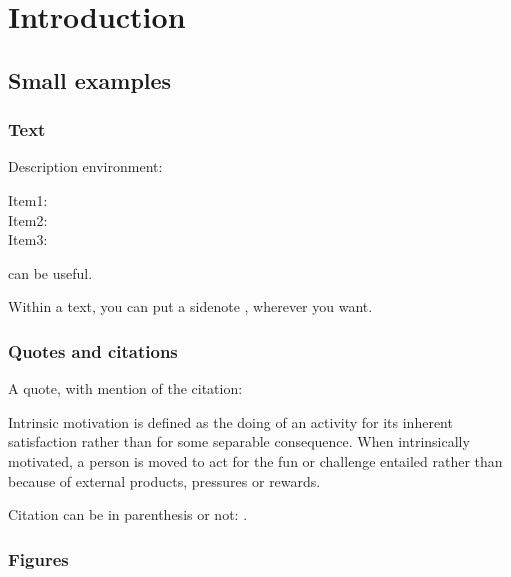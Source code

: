 \chapter{Introduction\label{chap:intro}}
\minitoc


\section{Small examples}

\subsection{Text}

Description environment:

\begin{description}

\item[Item1:] \lipsum[1]

\item[Item2:] \lipsum[1]

\item[Item3:] \lipsum[1]


\end{description}

 can be useful.

Within a text, you can put a sidenote , wherever you want.



\subsection{Quotes and citations}

A quote, with mention of the citation:

\begin{aquote}{\cite{ryan2000intrinsic}}

Intrinsic motivation is defined as the doing of an activity for its inherent satisfaction rather than for some separable consequence. When intrinsically motivated, a person is moved to act for the fun or challenge entailed rather than because of external products, pressures or rewards.
\end{aquote}

Citation can be in parenthesis \parencite{schueller2018complexity} or not: \cite{schueller2018complexity}.


\subsection{Figures}

